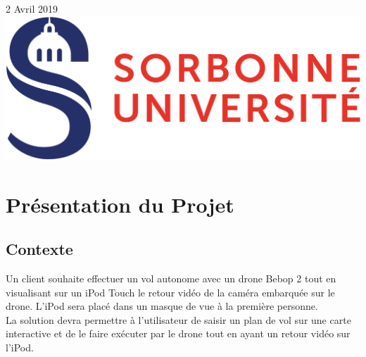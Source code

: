 \documentclass{article}
\begin{document}
\begin{titlepage}

{\large 2 Avril 2019}\\[3cm] %


\includegraphics[scale=0.15]{logo_sorbonne.png} %
 

\vfill %

\end{titlepage}

\newpage
\renewcommand{\contentsname}{\center{Table des Matières}\vspace*{5cm}}

\tableofcontents



\newpage
\section{Présentation du Projet}
	\subsection{Contexte}
		Un client souhaite effectuer un vol autonome avec un drone Bebop 2 tout en visualisant sur un iPod Touch le retour vidéo de la caméra embarquée sur le drone. L'iPod sera placé dans un masque de vue à la première personne. \\	
		La solution devra permettre à l'utilisateur de saisir un plan de vol sur une carte interactive et de le faire exécuter par le drone tout en ayant un retour vidéo sur l'iPod.\\
		
\end{document}
